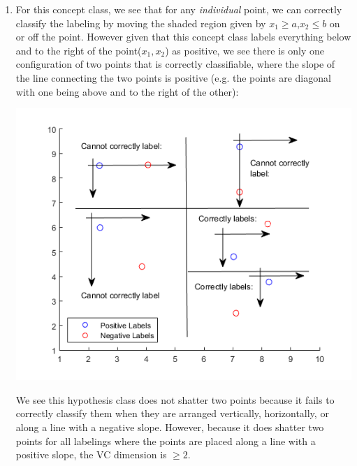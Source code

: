 \documentclass[11pt,a4paper]{article}
\begin{document}
\begin{itemize}
\begin{enumerate} [label={\alph*)}]
					\item For this concept class, we see that for any \textit{individual} point, we can correctly classify the labeling by moving the shaded region given by $x_1 \geq a$,$x_2 \leq b$ on or off the point. However given that this concept class labels everything below and to the right of the point($x_1,x_2$) as positive, we see there is only one configuration of two points that is correctly classifiable, where the slope of the line connecting the two points is positive (e.g. the points are diagonal with one being above and to the right of the other):
					\begin{center}
						\includegraphics[width=1\linewidth]{q3b}
					\end{center}
					
					We see this hypothesis class does not shatter two points because it fails to correctly classify them when they are arranged vertically, horizontally, or along a line with a negative slope. However, because it does shatter two points for all labelings where the points are placed along a line with a positive slope, the VC dimension is $\geq 2$.\\
					

\end{enumerate}
\end{itemize}
\end{document}
